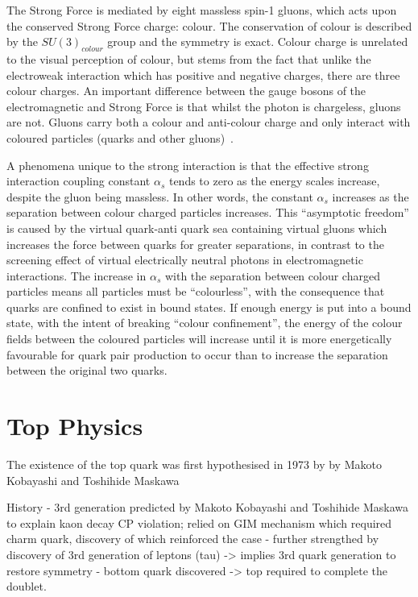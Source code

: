 The Strong Force is mediated by eight massless spin-1 gluons, which acts upon the conserved Strong Force charge: colour\cite{ElectroweakStrong}. 
The conservation of colour is described by the $SU(3)_{colour}$ group and the symmetry is exact. 
Colour charge is unrelated to the visual perception of colour, but stems from the fact that unlike the electroweak interaction which has positive and negative charges, there are three colour charges. 
An important difference between the gauge bosons of the electromagnetic and Strong Force is that whilst the photon is chargeless, gluons are not. 
Gluons carry both a colour and anti-colour charge and only interact with coloured particles (quarks and other gluons)~\cite{ElectroweakStrong}. 

A phenomena unique to the strong interaction is that the effective strong interaction coupling constant $\alpha_{s}$ tends to zero as the energy scales increase, despite the gluon being massless. 
In other words, the constant $\alpha_{s}$ increases as the separation between colour charged particles increases. 
This ``asymptotic freedom'' is caused by the virtual quark-anti quark sea containing virtual gluons which increases the force between quarks for greater separations, in contrast to the screening effect of virtual electrically neutral photons in electromagnetic interactions. 
The increase in $\alpha_{s}$ with the separation between colour charged particles means all particles must be ``colourless'', with the consequence that quarks are confined to exist in bound states\cite{ElectroweakStrong}. 
If enough energy is put into a bound state, with the intent of breaking ``colour confinement'', the energy of the colour fields between the coloured particles will increase until it is more energetically favourable for quark pair production to occur than to increase the separation between the original two quarks\cite{Griffiths}. 



\section{Top Physics}\label{sec:top-physics}

The existence of the top quark was first hypothesised in 1973 by by Makoto Kobayashi and Toshihide Maskawa

History - 3rd generation predicted by Makoto Kobayashi and Toshihide Maskawa to explain kaon decay CP violation; relied on GIM mechanism which required charm quark, discovery of which reinforced the case
- further strengthed by discovery of 3rd generation of leptons (tau) -> implies 3rd quark generation to restore symmetry
- bottom quark discovered -> top required to complete the doublet.

